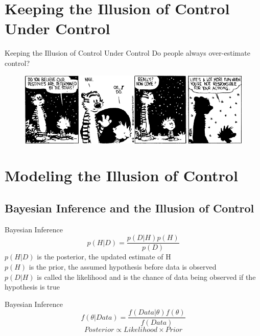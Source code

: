 \documentclass{beamer}
\begin{document}
\section{Keeping the Illusion of Control Under Control}
\begin{frame}{Keeping the Illusion of Control Under Control}
	Do people always over-estimate control?
	\pause
	\begin{figure}
	\begin{center}
		\includegraphics[width=\linewidth]{19880409}
	\end{center}
	\end{figure}
\end{frame}

\section{Modeling the Illusion of Control}
\subsection*{Bayesian Inference and the Illusion of Control}
	\begin{frame}{Bayesian Inference}
	\begin{equation*}
		p(H|D) = \frac{p(D|H)p(H)}{p(D)}
	\end{equation*}
		$p(H|D)$ is the posterior, the updated estimate of H\\
		$p(H)$ is the prior, the assumed hypothesis before data is observed\\ 
		$p(D|H)$ is called the likelihood and is the chance of data being observed if the hypothesis is true\\
\end{frame}

\begin{frame}{Bayesian Inference}
	\begin{equation*}
	f(\theta|Data) = \frac{f(Data|\theta)f(\theta)}{f(Data)} 
	\end{equation*}
	\pause
	\begin{displaymath}
	Posterior \propto Likelihood \times Prior
	\end{displaymath}
\end{frame}
\end{document}
